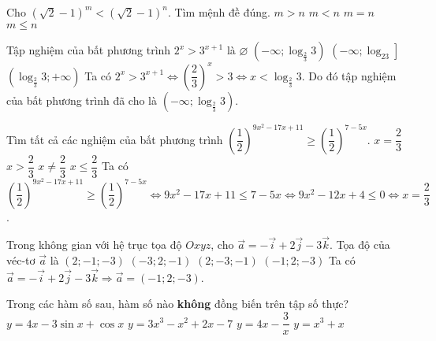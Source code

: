 \begin{ex}%
Cho $\left(\sqrt{2}-1\right)^m<\left(\sqrt{2}-1\right)^n$. Tìm mệnh đề đúng.
\choice
{\True $m>n$}
{$m<n$}
{$m=n$}
{$m\leq n$}
\end{ex}

\begin{ex}%
Tập nghiệm của bất phương trình $2^x>3^{x+1}$ là
\choice
{$\varnothing$}
{\True $\left(-\infty;\log_{\frac{2}{3}}3\right)$}
{$\left(-\infty;\log_23\right]$}
{$\left(\log_{\frac{2}{3}}3;+\infty\right)$}
\loigiai
{Ta có $2^x>3^{x+1}\Leftrightarrow \left(\dfrac{2}{3}\right)^x>3\Leftrightarrow x<\log_{\frac{2}{3}}3$. Do đó tập nghiệm của bất phương trình đã cho là $\left(-\infty;\log_{\frac{2}{3}}3\right)$.}
\end{ex}

\begin{ex}%
Tìm tất cả các nghiệm của bất phương trình $\left(\dfrac{1}{2}\right)^{9x^2-17x+11}\geq\left(\dfrac{1}{2}\right)^{7-5x}$.
\choice
{\True $x=\dfrac{2}{3}$}
{$x>\dfrac{2}{3}$}
{$x\neq\dfrac{2}{3}$}
{$x\leq\dfrac{2}{3}$}
\loigiai
{Ta có $\left(\dfrac{1}{2}\right)^{9x^2-17x+11}\geq\left(\dfrac{1}{2}\right)^{7-5x}\Leftrightarrow 9x^2-17x+11\leq 7-5x\Leftrightarrow 9x^2-12x+4\leq 0\Leftrightarrow x=\dfrac{2}{3}$.}
\end{ex}

\begin{ex}%
Trong không gian với hệ trục tọa độ $Oxyz$, cho $\vec{a}=-\vec{i}+2\vec{j}-3\vec{k}$. Tọa độ của véc-tơ $\vec{a}$ là
\choice
{$(2;-1;-3)$}
{$(-3;2;-1)$}
{$(2;-3;-1)$}
{\True $(-1;2;-3)$}
\loigiai
{Ta có $\vec{a}=-\vec{i}+2\vec{j}-3\vec{k}\Rightarrow\vec{a}=(-1;2;-3)$.}
\end{ex}

\begin{ex}%
Trong các hàm số sau, hàm số nào \textbf{không} đồng biến trên tập số thực?
\choice
{$y=4x-3\sin x+\cos x$}
{$y=3x^3-x^2+2x-7$}
{\True $y=4x-\dfrac{3}{x}$}
{$y=x^3+x$}
\end{ex}

